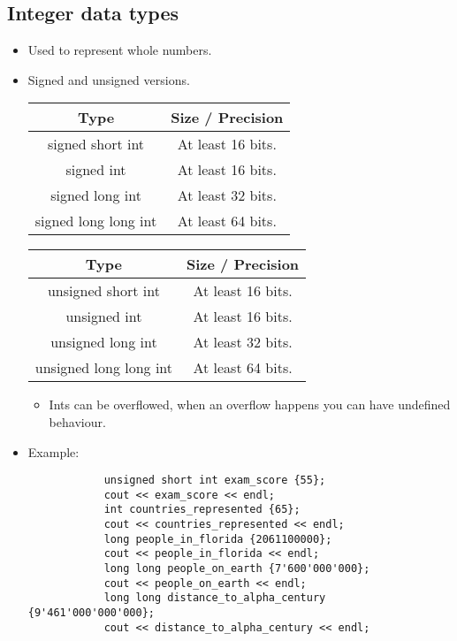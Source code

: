 \subsection{Integer data types}
\begin{itemize}
    \item Used to represent whole numbers.
    \item Signed and unsigned versions.
        \begin{center}
            \begin{tabular}{ |c|c| }
                \hline
                    Type & Size / Precision \\
                \hline
                    signed short int & At least 16 bits. \\ 
                    signed int & At least 16 bits.  \\ 
                    signed long int & At least 32 bits. \\ 
                    signed long long int & At least 64 bits. \\ 
                \hline
            \end{tabular}
            \begin{tabular}{ |c|c| }
                \hline
                    Type & Size / Precision \\
                \hline
                    unsigned short int & At least 16 bits. \\ 
                    unsigned int & At least 16 bits.  \\ 
                    unsigned long int & At least 32 bits. \\ 
                    unsigned long long int & At least 64 bits. \\ 
                \hline
            \end{tabular}
        \end{center}
        \begin{itemize}
            \item Ints can be overflowed, when an overflow happens you can have undefined behaviour.
        \end{itemize}

    \item Example: 
        \begin{verbatim}
            unsigned short int exam_score {55};
            cout << exam_score << endl;
            int countries_represented {65};
            cout << countries_represented << endl;
            long people_in_florida {2061100000};
            cout << people_in_florida << endl;
            long long people_on_earth {7'600'000'000};
            cout << people_on_earth << endl;
            long long distance_to_alpha_century {9'461'000'000'000};
            cout << distance_to_alpha_century << endl;
        \end{verbatim}
\end{itemize}

